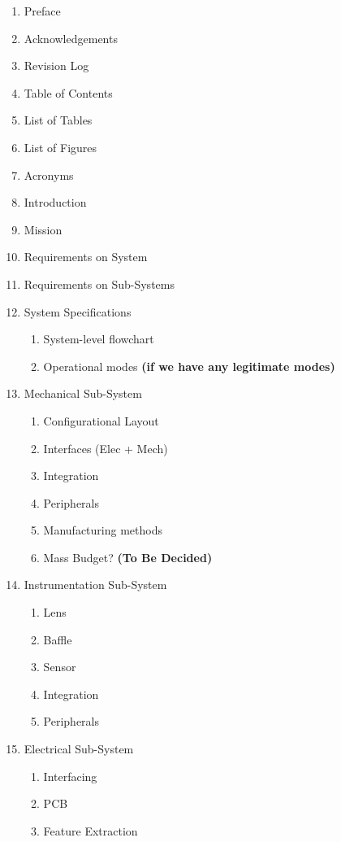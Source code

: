 \documentclass[../../main.tex]{subfiles}
\begin{document}
\begin{enumerate}
    \item Preface
    \item Acknowledgements
    \item Revision Log
    \item Table of Contents
    \item List of Tables
    \item List of Figures
    \item Acronyms
    \item Introduction
    \item Mission
    \item Requirements on System
    \item Requirements on Sub-Systems
    \item System Specifications
    \begin{enumerate}
        \item System-level flowchart
        \item Operational modes \textbf{(if we have any legitimate modes)}
    \end{enumerate}
    \item Mechanical Sub-System
    \begin{enumerate}
        \item Configurational Layout
        \item Interfaces (Elec + Mech)
        \item Integration
        \item Peripherals
        \item Manufacturing methods
        \item Mass Budget? \textbf{(To Be Decided)}
    \end{enumerate}
    \item Instrumentation Sub-System
    \begin{enumerate}
        \item Lens
        \item Baffle
        \item Sensor
        \item Integration
        \item Peripherals
    \end{enumerate}
    \item Electrical Sub-System
    \begin{enumerate}
        \item Interfacing
        \item PCB
        \item Feature Extraction

\end{enumerate}
\end{enumerate}
\end{document}
